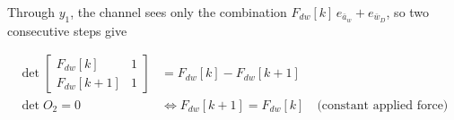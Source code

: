 \documentclass[11pt,a4paper,fontset=none]{ctexart}
\newcommand{\ba}{\bar{a}}
\newcommand{\bwD}{\bar{w}_D}
\begin{document}
Through $y_1$, the channel sees only the combination
$F_{dw}[k]\,e_{\ba_w} + e_{\bwD}$, so two consecutive steps give

\begin{align*}
\det\begin{bmatrix} F_{dw}[k] & 1 \\ F_{dw}[k+1] & 1 \end{bmatrix}
  &= F_{dw}[k] - F_{dw}[k+1] \\
\det O_2 = 0 &\iff F_{dw}[k+1] = F_{dw}[k]
  \quad \text{(constant applied force)}
\end{align*}
\end{document}
